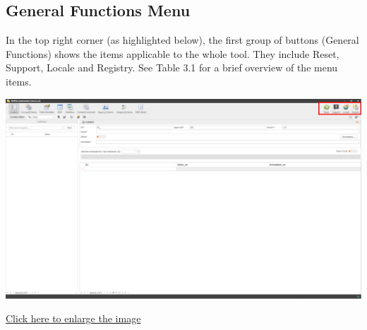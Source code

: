 \documentclass[
]{book}
\begin{document}
\hypertarget{general-functions-menu}{%
\subsection{General Functions Menu}\label{general-functions-menu}}

In the top right corner (as highlighted below), the first group of buttons (General Functions) shows the items applicable to the whole tool. They include Reset, Support, Locale and Registry. See Table 3.1 for a brief overview of the menu items.

\begin{center}\includegraphics[width=1\linewidth]{./images/image011} \end{center}

\href{images/image011.png}{Click here to enlarge the image}
\end{document}
